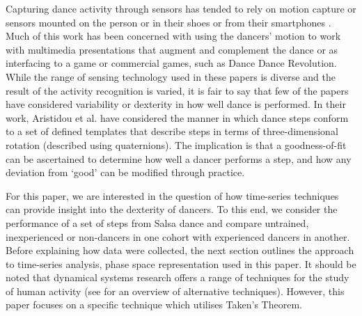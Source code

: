 \documentclass{sigchi}
\begin{document}
Capturing dance activity through sensors has tended to rely on motion capture 
\cite{Alexiadis2014} %
or sensors mounted on the person \cite{Lynch2005} %
or in their shoes \cite{Paradiso1997} %
or from their smartphones  \cite{Wei2014}. %
Much of this work has been concerned with using the dancers’ motion to work with 
multimedia presentations that augment and complement the dance \cite{Griffith1998, Park2006}
or as interfacing to a game \cite{Chu2012} %
or commercial games, such as Dance Dance Revolution.  
While the range of sensing technology used in these papers is diverse and the result of the activity 
recognition is varied, it is fair to say that few of the papers have considered 
variability or dexterity in how well dance is performed. 
In their work, Aristidou et al. \cite{Aristidou2014} %
have considered the manner in which dance steps conform to a set of defined 
templates that describe steps in terms of three-dimensional rotation (described using quaternions).  
The implication is that a goodness-of-fit can be ascertained to determine how well a dancer performs a step, 
and how any deviation from ‘good’ can be modified through practice. 


For this paper, we are interested in the question of how time-series techniques can provide insight into 
the dexterity of dancers. To this end, we consider the performance of a set of steps from Salsa dance and 
compare untrained, inexperienced or non-dancers in one cohort with experienced dancers in another. 
Before explaining how data were collected, the next section outlines the approach to time-series analysis,
phase space representation used in this paper. 
It should be noted that dynamical systems research offers a range of techniques for the study of human activity 
(see \cite{Guastello2011} for an overview of alternative techniques). 
However, this paper focuses on a specific technique which utilises Taken's Theorem.
\end{document}
